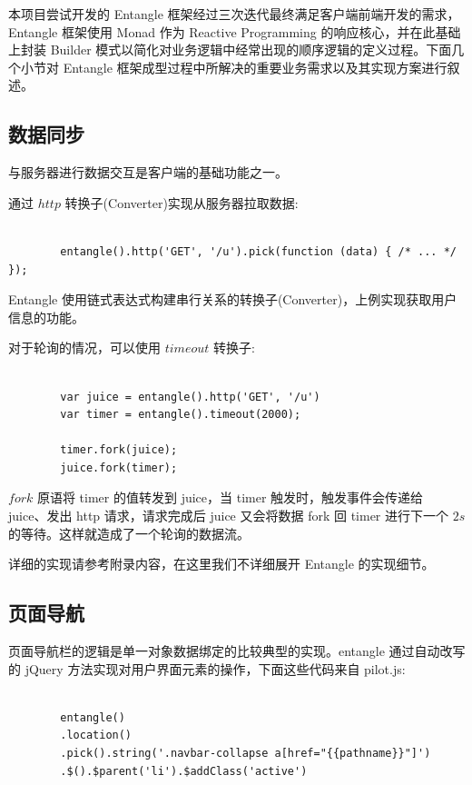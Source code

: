 本项目尝试开发的 Entangle 框架经过三次迭代最终满足客户端前端开发的需求，Entangle 框架使用 Monad 作为 Reactive Programming 的响应核心，并在此基础上封装 Builder 模式以简化对业务逻辑中经常出现的顺序逻辑的定义过程。下面几个小节对 Entangle 框架成型过程中所解决的重要业务需求以及其实现方案进行叙述。

\subsection{数据同步}

与服务器进行数据交互是客户端的基础功能之一。

通过 $http$ 转换子(Converter)实现从服务器拉取数据:

\begin{verbatim}

        entangle().http('GET', '/u').pick(function (data) { /* ... */ });

\end{verbatim}

Entangle 使用链式表达式构建串行关系的转换子(Converter)，上例实现获取用户信息的功能。

对于轮询的情况，可以使用 $timeout$ 转换子:

\begin{verbatim}

        var juice = entangle().http('GET', '/u')
        var timer = entangle().timeout(2000);

        timer.fork(juice);
        juice.fork(timer);

\end{verbatim}

$fork$ 原语将 timer 的值转发到 juice，当 timer 触发时，触发事件会传递给 juice、发出 http 请求，请求完成后 juice 又会将数据 fork 回 timer 进行下一个 $2s$ 的等待。这样就造成了一个轮询的数据流。

详细的实现请参考附录内容，在这里我们不详细展开 Entangle 的实现细节。

\subsection{页面导航}

页面导航栏的逻辑是单一对象数据绑定的比较典型的实现。entangle 通过自动改写的 jQuery 方法实现对用户界面元素的操作，下面这些代码来自 pilot.js:

\begin{verbatim}

        entangle()
        .location()
        .pick().string('.navbar-collapse a[href="{{pathname}}"]')
        .$().$parent('li').$addClass('active')

\end{verbatim}

